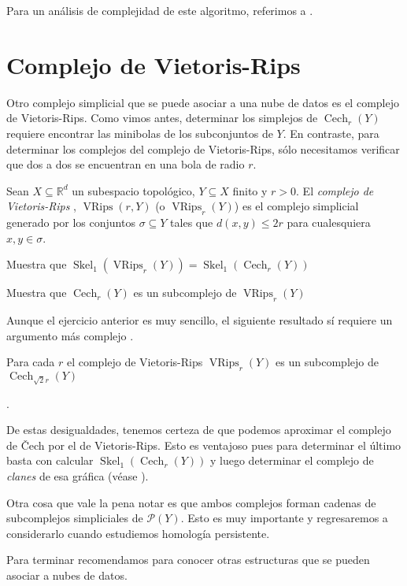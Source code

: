 \documentclass{standalone}
\begin{document}
	Para un análisis de complejidad de este algoritmo, referimos a \cite{edelsbrunner:2010:computational}.
	
	\section{Complejo de Vietoris-Rips}
	Otro complejo simplicial que se puede asociar a una nube de datos es el complejo de Vietoris-Rips. Como vimos antes, determinar los simplejos de $\operatorname{Cech}_{r}(Y)$ requiere encontrar las minibolas de los subconjuntos de $Y$. En contraste, para determinar los complejos del complejo de Vietoris-Rips, sólo necesitamos verificar que dos a dos se encuentran en una bola de radio $r$.
	
	\begin{definition}\label{def:vietoris_rips}
		Sean $X\subseteq\mathbb{R}^{d}$ un subespacio topológico, $Y\subseteq X$ finito y $r>0$. El \emph{complejo de Vietoris-Rips }, $\operatorname{VRips}(r,Y)$ (o $\operatorname{VRips}_{r}(Y)$) es el complejo simplicial generado por los conjuntos $\sigma\subseteq Y$  tales que $d(x,y)\leq2r$ para cualesquiera $x,y\in\sigma$.
	\end{definition}
	
	\begin{exercise}
		Muestra que $\operatorname{Skel}_{1}(\operatorname{VRips}_{r}(Y)) = \operatorname{Skel}_{1}(\operatorname{Cech}_{r}(Y))$
	\end{exercise}
	
	\begin{exercise}
		Muestra que $\operatorname{Cech}_{r}(Y)$ es un subcomplejo de $\operatorname{VRips}_{r}(Y)$
	\end{exercise}
	
	Aunque el ejercicio anterior es muy sencillo, el siguiente resultado sí requiere un argumento más complejo \cite{edelsbrunner:2010:computational}.
	
	\begin{lemma}
		Para cada $r$ el complejo de Vietoris-Rips $\operatorname{VRips}_{r}(Y)$ es un subcomplejo de $\operatorname{Cech}_{\sqrt{2}r}(Y)$ 
	\end{lemma}.
	
	De estas desigualdades, tenemos certeza de que podemos aproximar el complejo de \v{C}ech por el de Vietoris-Rips. Esto es ventajoso pues para determinar el último basta con calcular $\operatorname{Skel}_{1}(\operatorname{Cech}_{r}(Y))$ y luego determinar el complejo de \emph{clanes} de esa gráfica (véase \cite{meshulam:2001:clique:homology}).
	
	Otra cosa que vale la pena notar es que ambos complejos forman cadenas de subcomplejos simpliciales de $\mathcal{P}(Y)$. Esto es muy importante y regresaremos a considerarlo cuando estudiemos homología persistente. 
	
	Para terminar recomendamos \cite{edelsbrunner:2010:computational, edelsbrunner:2014:computational} para conocer otras estructuras que se pueden asociar a nubes de datos.  
\end{document}
